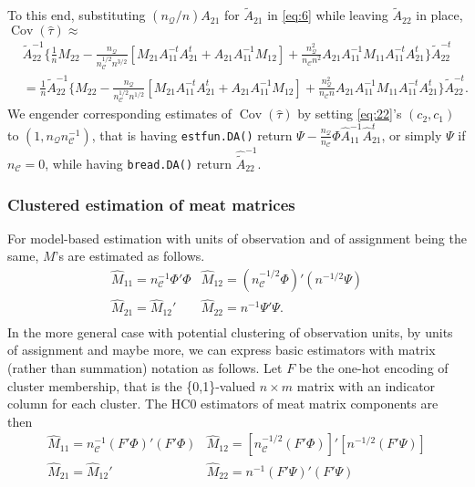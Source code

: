 \documentclass{article}
\begin{document}
To this end, substituting $(n_{\mathcal{Q}}/n)A_{21}$ for $\tilde{A}_{21}$ in \eqref{eq:6} while leaving
$\tilde{A}_{22}$ in place, $\operatorname{Cov}(\hat\tau) \approx$
  \begin{align*}
  &\tilde{A}_{22}^{-1}\{\frac{1}{n} M_{22} -
                                 \frac{n_{\mathcal{Q}}}{n_{\mathcal{C}}^{1/2}n^{3/2}}[M_{21}A_{11}^{-t}A_{21}^t
                                 + A_{21}A_{11}^{-1}M_{12}] +
                                 \frac{n_{\mathcal{Q}}^{2}}{n_{\mathcal{C}}n^{2}}A_{21}A_{11}^{-1}M_{11}A_{11}^{-t}A_{21}^{t}\}\tilde{A}_{22}^{-t}\nonumber
    \\
  &= \frac{1}{n}\tilde{A}_{22}^{-1}\{M_{22} -
                                 \frac{n_{\mathcal{Q}}}{n_{\mathcal{C}}^{1/2}n^{1/2}}[M_{21}A_{11}^{-t}A_{21}^t
                                 + A_{21}A_{11}^{-1}M_{12}] +
                                 \frac{n_{\mathcal{Q}}^{2}}{n_{\mathcal{C}}n}A_{21}A_{11}^{-1}M_{11}A_{11}^{-t}A_{21}^{t}\}\tilde{A}_{22}^{-t} .\nonumber
  \end{align*}
 We engender corresponding estimates of $\operatorname{Cov}(\hat\tau)$ by setting \eqref{eq:22}'s
 $(c_{2}, c_{1})$ to $(1, n_{\mathcal{Q}}n_{\mathcal{C}}^{-1})$, that is having
 \texttt{estfun.DA()} return $\Psi -
 \frac{n_{\mathcal{Q}}}{n_{\mathcal{C}}}\Phi
 \hat{A}_{11}^{-1}\hat{A}_{21}^{t}$, or simply $\Psi$ if $n_{\mathcal{C}}=0$, while having \texttt{bread.DA()}
 return $\hat{\tilde{A}}_{22}^{-1}$.


  \subsubsection{Clustered estimation of meat matrices}
For model-based estimation with units of observation and of assignment being
the same, $M$'s are estimated as follows.
\begin{equation}\label{eq:7}
  \begin{array}{cc}
  \hat{M}_{11} =n_{\mathcal{C}}^{-1} \Phi'\Phi & \hat{M}_{12} = (n_{\mathcal{C}}^{-1/2}\Phi)'(n^{-1/2} \Psi)\\
    \hat{M}_{21} =\hat{M}_{12}' & \hat{M}_{22}= n^{-1}\Psi'\Psi.\\
    \end{array}
  \end{equation}
  In the more general case with potential clustering of observation
units, by units of assignment and maybe more, we can express
basic estimators with matrix (rather than summation) notation as
follows. Let
$F$ be the one-hot encoding of cluster membership, that is the \{0,1\}-valued $n \times m$ matrix with an indicator
column for each cluster. The HC0 estimators of meat matrix components
are then
\begin{equation} \label{eq:8}
  \begin{array}{cc}
  \hat{M}_{11} =n_{\mathcal{C}}^{-1} (F'\Phi)'(F'\Phi) & \hat{M}_{12} = [n_{\mathcal{C}}^{-1/2} (F'\Phi)]'[n^{-1/2} (F'\Psi)]\\
    \hat{M}_{21} =\hat{M}_{12}' & \hat{M}_{22}= n^{-1}(F'\Psi)'(F'\Psi)\\
    \end{array}
  \end{equation}
\end{document}

